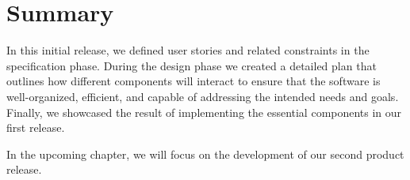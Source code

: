 \section*{Summary}

In this initial release, we defined user stories and related constraints in the specification phase.
During the design phase we created a detailed plan that outlines how different components will interact to
ensure that the software is well-organized, efficient, and capable of addressing the intended needs and
goals. Finally, we showcased the result of implementing the essential components in our first release.

\noindent In the upcoming chapter, we will focus on the development of our second product release.